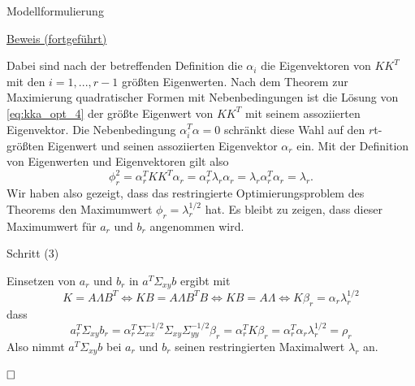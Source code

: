 \documentclass[
  8pt,
  ignorenonframetext,
]{beamer}
\begin{document}
\begin{frame}{Modellformulierung}
\protect\hypertarget{modellformulierung-8}{}
\footnotesize

\underline{Beweis (fortgeführt)}

Dabei sind nach der betreffenden Definition die \(\alpha_i\) die
Eigenvektoren von \(KK^T\) mit den \(i = 1,...,r-1\) größten
Eigenwerten. Nach dem Theorem zur Maximierung quadratischer Formen mit
Nebenbedingungen ist die Lösung von \eqref{eq:kka_opt_4} der größte
Eigenwert von \(KK^T\) mit seinem assoziierten Eigenvektor. Die
Nebenbedingung \(\alpha_i^T\alpha = 0\) schränkt diese Wahl auf den
\(r\)t-größten Eigenwert und seinen assoziierten Eigenvektor
\(\alpha_r\) ein. Mit der Definition von Eigenwerten und Eigenvektoren
gilt also \begin{equation}
\phi_r^2 = \alpha_r^T KK^T \alpha_r = \alpha_r^T \lambda_r \alpha_r = \lambda_r \alpha_r^T\alpha_r = \lambda_r.
\end{equation} Wir haben also gezeigt, dass das restringierte
Optimierungsproblem des Theorems den Maximumwert
\(\phi_r = \lambda_r^{1/2}\) hat. Es bleibt zu zeigen, dass dieser
Maximumwert für \(a_r\) und \(b_r\) angenommen wird.

Schritt (3)

Einsetzen von \(a_r\) und \(b_r\) in \(a^T\Sigma_{xy}b\) ergibt mit
\begin{equation}
K = A\Lambda B^T
\Leftrightarrow KB = A\Lambda B^TB
\Leftrightarrow KB = A\Lambda
\Leftrightarrow K\beta_r = \alpha_r\lambda_r^{1/2}
\end{equation} dass \begin{equation}
a^T_r\Sigma_{xy}b_r
= \alpha_r^T\Sigma_{xx}^{-1/2}\Sigma_{xy}\Sigma_{yy}^{-1/2}\beta_r
= \alpha_r^TK\beta_r
= \alpha_r^T\alpha_r\lambda_r^{1/2}
= \rho_r
\end{equation} Also nimmt \(a^T\Sigma_{xy}b\) bei \(a_r\) und \(b_r\)
seinen restringierten Maximalwert \(\lambda_r\) an.

\(\hfill\Box\)
\end{frame}
\end{document}
